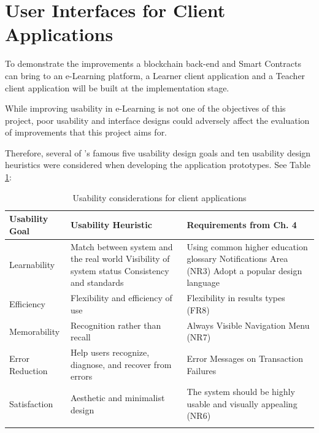 \section{User Interfaces for Client Applications}

To demonstrate the improvements a blockchain back-end and Smart Contracts can bring to an e-Learning platform, a
Learner client application and a Teacher client application will be built at the implementation stage.

While improving usability in e-Learning is not one of the objectives of this project, poor usability and interface designs
could adversely affect the evaluation of improvements that this project aims for.

Therefore, several of \citet{nielsen199510}'s famous five usability design goals and ten usability design heuristics
were considered when developing the application prototypes. See Table \ref{table:ux_considerations}:

\begin{table}[!ht]
	\caption{Usability considerations for client applications}
	\centering
	\label{table:ux_considerations}
	\begin{tabularx}{\textwidth}{lXX}
		Usability Goal            & Usability Heuristic                                    & Requirements from Ch. 4                                         \\
		\toprule
		Learnability              & Match between system and the real world\newline
		Visibility of system status \newline
		Consistency and standards & Using common higher education glossary \newline
		Notifications Area (NR3) \newline
		Adopt a popular design language                                                                                                                       \\
		\midrule
		Efficiency                & Flexibility and efficiency of use                       & Flexibility in results types (FR8)                              \\
		\midrule
		Memorability              & Recognition rather than recall                          & Always Visible Navigation Menu (NR7)                            \\
		\midrule
		Error Reduction           & Help users recognize, diagnose, and recover from errors & Error Messages on Transaction Failures                          \\
		\midrule
		Satisfaction              & Aesthetic and minimalist design                         & The system should be highly usable and visually appealing (NR6) \\                                                               \\
		\bottomrule
	\end{tabularx}
\end{table}

